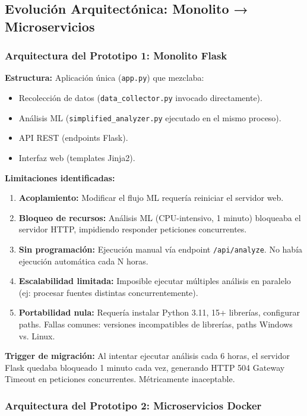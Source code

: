 \subsection{Evolución Arquitectónica: Monolito → Microservicios}
\label{subsec:evolucion_arquitectura}

\subsubsection{Arquitectura del Prototipo 1: Monolito Flask}

\textbf{Estructura:} Aplicación única (\texttt{app.py}) que mezclaba:
\begin{itemize}
    \item Recolección de datos (\texttt{data\_collector.py} invocado directamente).
    \item Análisis ML (\texttt{simplified\_analyzer.py} ejecutado en el mismo proceso).
    \item API REST (endpoints Flask).
    \item Interfaz web (templates Jinja2).
\end{itemize}

\textbf{Limitaciones identificadas:}
\begin{enumerate}
    \item \textbf{Acoplamiento:} Modificar el flujo ML requería reiniciar el servidor web.
    \item \textbf{Bloqueo de recursos:} Análisis ML (CPU-intensivo, 1 minuto) bloqueaba el servidor HTTP, impidiendo responder peticiones concurrentes.
    \item \textbf{Sin programación:} Ejecución manual vía endpoint \texttt{/api/analyze}. No había ejecución automática cada N horas.
    \item \textbf{Escalabilidad limitada:} Imposible ejecutar múltiples análisis en paralelo (ej: procesar fuentes distintas concurrentemente).
    \item \textbf{Portabilidad nula:} Requería instalar Python 3.11, 15+ librerías, configurar paths. Fallas comunes: versiones incompatibles de librerías, paths Windows vs. Linux.
\end{enumerate}

\textbf{Trigger de migración:} Al intentar ejecutar análisis cada 6 horas, el servidor Flask quedaba bloqueado 1 minuto cada vez, generando HTTP 504 Gateway Timeout en peticiones concurrentes. Métricamente inaceptable.

\subsubsection{Arquitectura del Prototipo 2: Microservicios Docker}

